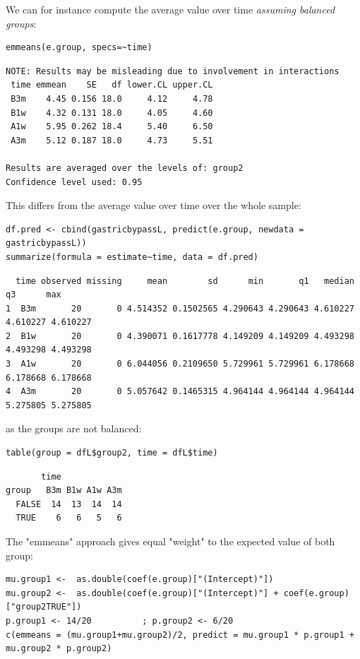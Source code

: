 \documentclass[12pt]{article}
\begin{document}
We can for instance compute the average value over time \emph{assuming balanced groups}:
\lstset{language=r,label= ,caption= ,captionpos=b,numbers=none}
\begin{lstlisting}
emmeans(e.group, specs=~time)
\end{lstlisting}

\begin{verbatim}
NOTE: Results may be misleading due to involvement in interactions
 time emmean    SE   df lower.CL upper.CL
 B3m    4.45 0.156 18.0     4.12     4.78
 B1w    4.32 0.131 18.0     4.05     4.60
 A1w    5.95 0.262 18.4     5.40     6.50
 A3m    5.12 0.187 18.0     4.73     5.51

Results are averaged over the levels of: group2 
Confidence level used: 0.95
\end{verbatim}


This differs from the average value over time over the whole sample:
\lstset{language=r,label= ,caption= ,captionpos=b,numbers=none}
\begin{lstlisting}
df.pred <- cbind(gastricbypassL, predict(e.group, newdata = gastricbypassL))
summarize(formula = estimate~time, data = df.pred)
\end{lstlisting}

\begin{verbatim}
  time observed missing     mean        sd      min       q1   median       q3      max
1  B3m       20       0 4.514352 0.1502565 4.290643 4.290643 4.610227 4.610227 4.610227
2  B1w       20       0 4.390071 0.1617778 4.149209 4.149209 4.493298 4.493298 4.493298
3  A1w       20       0 6.044056 0.2109650 5.729961 5.729961 6.178668 6.178668 6.178668
4  A3m       20       0 5.057642 0.1465315 4.964144 4.964144 4.964144 5.275805 5.275805
\end{verbatim}


as the groups are not balanced:
\lstset{language=r,label= ,caption= ,captionpos=b,numbers=none}
\begin{lstlisting}
table(group = dfL$group2, time = dfL$time)
\end{lstlisting}

\begin{verbatim}
       time
group   B3m B1w A1w A3m
  FALSE  14  13  14  14
  TRUE    6   6   5   6
\end{verbatim}


The "emmeans" approach gives equal "weight" to the expected value of
both group:
\lstset{language=r,label= ,caption= ,captionpos=b,numbers=none}
\begin{lstlisting}
mu.group1 <-  as.double(coef(e.group)["(Intercept)"])
mu.group2 <-  as.double(coef(e.group)["(Intercept)"] + coef(e.group)["group2TRUE"])
p.group1 <- 14/20          ; p.group2 <- 6/20
c(emmeans = (mu.group1+mu.group2)/2, predict = mu.group1 * p.group1 + mu.group2 * p.group2)
\end{lstlisting}
\end{document}
